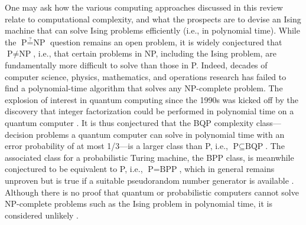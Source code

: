 \documentclass[fleqn,10pt]{wlscirep}
\def\change#1{#1}
\begin{document}
One may ask how the various computing approaches discussed in this review relate to computational complexity, and what the prospects are to devise an Ising machine that can solve Ising problems efficiently (i.e., in polynomial time). While the  $\text{P} \stackrel{?}{=} \text{NP} $ question remains an open problem, it is widely conjectured that $ \text{P} \neq \text{NP} $, i.e., that certain problems in NP, including the Ising problem, are fundamentally more difficult to solve than those in P. Indeed, decades of computer science, physics, mathematics, and operations research has failed to find a polynomial-time algorithm that solves any \change{NP-complete} problem. The explosion of interest in quantum computing since the 1990s was kicked off by the discovery that integer factorization could be performed in polynomial time on a quantum computer \cite{shor1999polynomial}.  It is thus conjectured that the BQP complexity class---decision problems a quantum computer can solve in polynomial time with an error probability of at most 1/3---is a larger class than P, i.e., $ \text{P} \subseteq \text{BQP} $.  The associated class for a probabilistic Turing machine, the BPP class, is meanwhile conjectured to be equivalent to P, i.e.,  $ \text{P} =  \text{BPP} $,  \change{which in general remains unproven but is true if a suitable pseudorandom number generator is available \cite{arora2009computational}}. Although there is no proof that quantum or probabilistic computers cannot solve NP-complete problems such as the Ising problem in polynomial time, it is considered unlikely \cite{aaronson2010bqp}.
\end{document}
